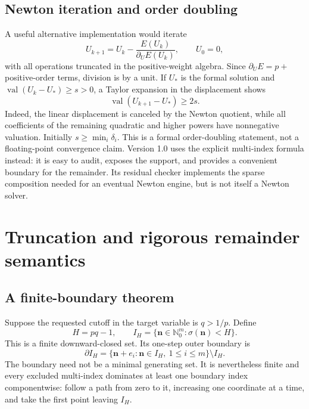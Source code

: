 \documentclass[11pt,a4paper]{article}
\numberwithin{equation}{section}
\theoremstyle{definition}
\theoremstyle{remark}
\newcommand{\N}{\mathbb N_0}
\newcommand{\val}{\operatorname{val}}
\begin{document}
\subsection{Newton iteration and order doubling}

A useful alternative implementation would iterate
\begin{equation}
 U_{k+1}=U_k-\frac{E(U_k)}{\partial_U E(U_k)},\qquad U_0=0,
 \label{eq:newton}
\end{equation}
with all operations truncated in the positive-weight algebra. Since
$\partial_U E=p+$ positive-order terms, division is by a unit.
If $U_*$ is the formal solution and
$\val(U_k-U_*)\ge s>0$, a Taylor expansion in the displacement shows
\[
 \val(U_{k+1}-U_*)\ge2s.
\]
Indeed, the linear displacement is canceled by the Newton quotient, while
all coefficients of the remaining quadratic and higher powers have
nonnegative valuation. Initially $s\ge\min_i\delta_i$.
This is a formal order-doubling statement, not a floating-point convergence
claim. Version 1.0 uses the explicit multi-index formula instead: it is easy
to audit, exposes the support, and provides a convenient boundary for the
remainder. Its residual checker implements the sparse composition needed
for an eventual Newton engine, but is not itself a Newton solver.

\section{Truncation and rigorous remainder semantics}
\label{sec:remainder}

\subsection{A finite-boundary theorem}

Suppose the requested cutoff in the target variable is $q>1/p$. Define
\begin{equation}
 H=pq-1,\qquad
 I_H=\{\boldsymbol n\in\N^m:\sigma(\boldsymbol n)<H\}.
 \label{eq:cutoff}
\end{equation}
This is a finite downward-closed set. Its one-step outer boundary is
\begin{equation}
 \partial I_H=\{\boldsymbol n+e_i:\boldsymbol n\in I_H,\ 1\le i\le m\}
                 \setminus I_H.
 \label{eq:boundary}
\end{equation}
The boundary need not be a minimal generating set. It is nevertheless
finite and every excluded multi-index dominates at least one boundary
index componentwise: follow a path from zero to it, increasing one
coordinate at a time, and take the first point leaving $I_H$.
\end{document}
